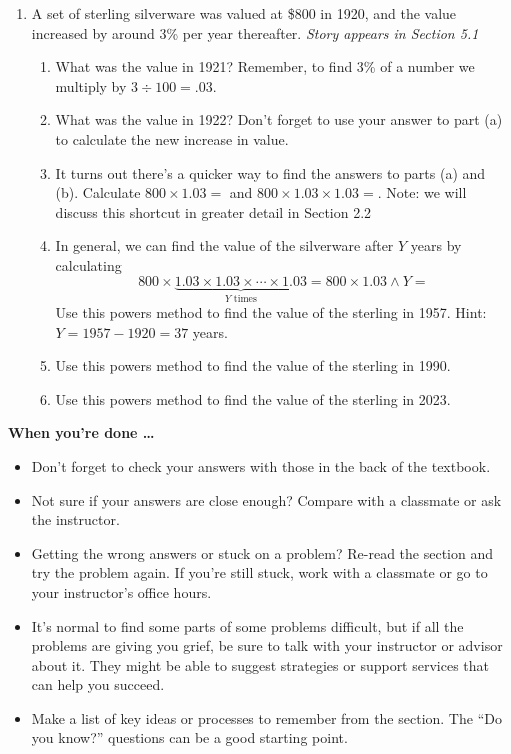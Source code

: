 \begin{enumerate}
\item A set of sterling silverware was valued at \$800 in 1920, and the value increased by around 3\% per year thereafter. \emph{Story appears in Section 5.1}
\begin{enumerate}
\item What was the value in 1921?  Remember, to find 3\% of a number we multiply by $3 \div 100 = .03$. %
\item What was the value in 1922?  Don't forget to use your answer to part (a) to calculate the new increase in value. %
\item It turns out there's a quicker way to find the answers to parts (a) and (b).  Calculate $800 \times 1.03=$ and $800 \times 1.03 \times 1.03 =$.   Note:  we will discuss this shortcut in greater detail in Section 2.2  %
\item In general, we can find the value of the silverware after $Y$ years by calculating $$800 \times \underbrace{1.03 \times 1.03 \times \cdots \times 1.03}_{Y \text{ times}} = 800 \times 1.03 \land Y =$$ 
Use this powers method to find the value of the sterling in 1957.  Hint: $Y = 1957-1920 = 37$ years. %
\item Use this powers method to find the value of the sterling in 1990. %
\item Use this powers method to find the value of the sterling in 2023. %
\end{enumerate}

\end{enumerate}

\bigskip

\noindent \textbf{When you're done \ldots}

\begin{itemize}
\item Don't forget to check your answers with those in the back of the textbook. 
\item Not sure if your answers are close enough? Compare with a classmate or ask the instructor.  
\item Getting the wrong answers or stuck on a problem?  Re-read the section and try the problem again.   If you're still stuck, work with a classmate or go to your instructor's office hours.
\item It's normal to find some parts of some problems difficult, but if all the problems are giving you grief, be sure to talk with your instructor or advisor about it.  They might be able to suggest strategies or support services that can help you succeed.
\item Make a list of key ideas or processes to remember from the section.  The ``Do you know?'' questions can be a good starting point.
\end{itemize}

